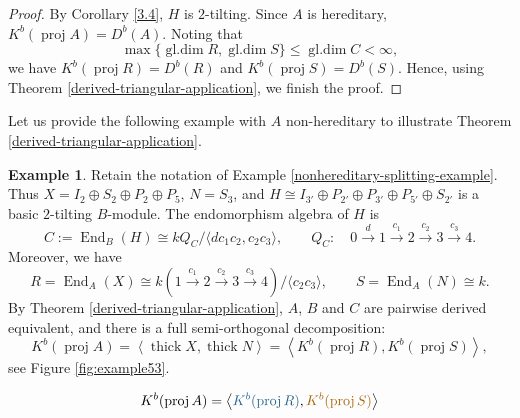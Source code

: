 \documentclass[reqno,12pt]{amsart}
\numberwithin{equation}{section}
\theoremstyle{plain}
\theoremstyle{definition}
\newtheorem{example}[theorem]{\bf Example}
\begin{document}
\begin{proof}
By Corollary \ref{3.4},   $H$ is
$2$-tilting.
Since $A$ is hereditary, $K^b(\operatorname{proj}A)=D^b(A)$. Noting that
\[
\max\{\operatorname{gl.dim}R,\operatorname{gl.dim}S\}
\leq\operatorname{gl.dim}C<\infty,
\]
we have $K^b(\operatorname{proj}R)=D^b(R)$ and
$K^b(\operatorname{proj}S)=D^b(S)$. Hence, using Theorem \ref{derived-triangular-application}, we finish the proof.
\end{proof}

Let us provide the following example with $A$ non-hereditary to illustrate Theorem \ref{derived-triangular-application}.

\begin{example}\label{nonhereditary-triangular-example}
Retain the notation of Example \ref{nonhereditary-splitting-example}.
Thus $X=I_2\oplus S_2\oplus P_2\oplus P_5$, $N=S_3$, and
$H\cong I_{3'}\oplus P_{2'}\oplus P_{3'}\oplus P_{5'}\oplus S_{2'}$
is a basic $2$-tilting $B$-module. The endomorphism algebra of $H$ is
\[
C:=\operatorname{End}_B(H)
\cong kQ_C/\langle dc_1c_2,c_2c_3\rangle,
\qquad
Q_C:\quad
0\overset d\longrightarrow1
\overset{c_1}\longrightarrow2
\overset{c_2}\longrightarrow3
\overset{c_3}\longrightarrow4.
\]
Moreover, we have
\[
R=\operatorname{End}_A(X)
\cong k(1\xrightarrow{c_1}2\xrightarrow{c_2}3\xrightarrow{c_3}4)
/\langle c_2c_3\rangle,
\qquad S=\operatorname{End}_A(N)\cong k.
\]
By Theorem \ref{derived-triangular-application},
$A$, $B$ and $C$ are pairwise derived equivalent, and there is a full semi-orthogonal decomposition:
\[
K^b(\operatorname{proj}A)=\left\langle \operatorname{thick}X,
\operatorname{thick}N\right\rangle
=\left\langle K^b(\operatorname{proj}R),
K^b(\operatorname{proj}S)\right\rangle,
\]
see Figure \ref{fig:example53}.
\begin{figure}[htbp]
\centering
\[
K^b(\operatorname{proj}A)=
\left\langle
\textcolor{sodA}{K^b(\operatorname{proj}R)},
\textcolor{sodB}{K^b(\operatorname{proj}S)}
\right\rangle
\]
\end{figure}
\end{example}
\end{document}

